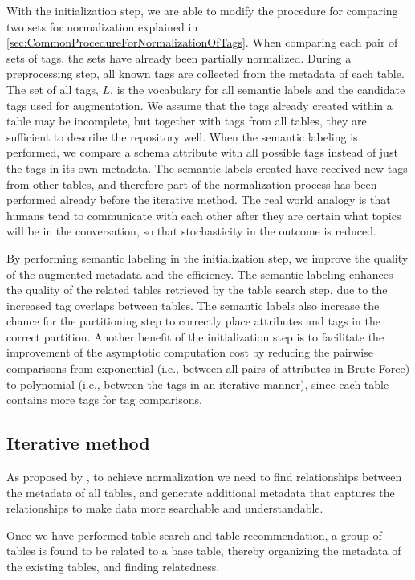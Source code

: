 With the initialization step, we are able to modify the procedure for comparing two sets for normalization explained in \autoref{sec:CommonProcedureForNormalizationOfTags}. When comparing each pair of sets of tags, the sets have already been  partially normalized. During a preprocessing step, all known tags are collected from the metadata of each table. The set of all tags, $L$, is the vocabulary for all semantic labels and the candidate tags used for augmentation. We assume that the tags already created within a table may be incomplete, but together with tags from all tables, they are sufficient to describe the repository well. When the semantic labeling is performed, we compare a schema attribute with all possible tags instead of just the tags in its own metadata. The semantic labels created have received new tags from other tables, and therefore part of the normalization process has been performed already before the iterative method. The real world analogy is that humans tend to communicate with each other after they are certain what topics will be in the conversation, so that stochasticity in the outcome is reduced.

By performing semantic labeling in the initialization step, we improve the quality of the augmented metadata and the efficiency. The semantic labeling enhances the quality of the related tables retrieved by the table search step, due to the increased tag overlaps between tables. The semantic labels also increase the chance for the partitioning step to correctly place attributes and tags in the correct partition. Another benefit of the initialization step is to facilitate the improvement of the asymptotic computation cost by reducing the pairwise comparisons from exponential (i.e., between all pairs of attributes in Brute Force) to polynomial (i.e., between the tags in an iterative manner), since each table contains more tags for tag comparisons.

\subsection{Iterative method}
\label{ssec:IterativeMethod}

As proposed by \cite{Smith2011Unity}, to achieve normalization we need to find relationships between the metadata of all tables, and generate additional metadata that captures the relationships to make data more searchable and understandable.

Once we have performed table search and table recommendation, a group of tables is found to be related to a base table, thereby organizing the metadata of the existing tables, and finding relatedness.

